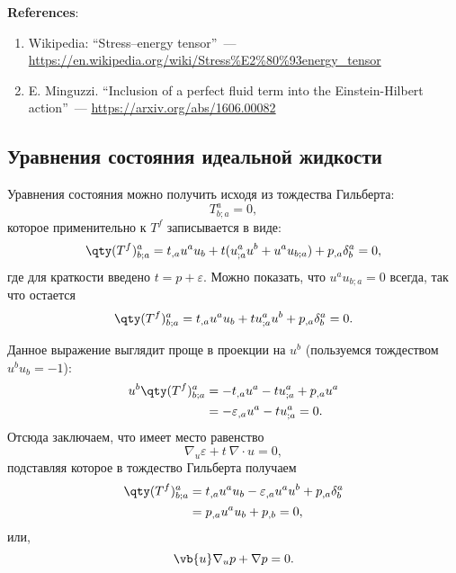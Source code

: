 \documentclass[\docroot/reports/draft/report.tex]{subfiles}
\begin{document}
    \vspace{1cm}

    \textbf{\Large{References}}:
    \begin{enumerate}
        \item Wikipedia: \enquote{Stress–energy tensor}~--- \url{https://en.wikipedia.org/wiki/Stress%E2%80%93energy_tensor}
        \item E. Minguzzi. \enquote{Inclusion of a perfect fluid term into the Einstein-Hilbert action}~--- \url{https://arxiv.org/abs/1606.00082}
    \end{enumerate}

\subsection{Уравнения состояния идеальной жидкости}

    Уравнения состояния можно получить исходя из тождества Гильберта:
    \begin{equation}
        T^a_{b;a} = 0 ,
    \end{equation}
    которое применительно к $T^f$ записывается в виде:
    \begin{equation*}
        \qty(T^f)^a_{b;a} = t_{,a} u^a u_b + t (u^a_{;a} u^b + u^a u_{b;a}) + p_{,a} \delta^a_b = 0,
    \end{equation*}
    где для краткости введено $t = p + \varepsilon$. Можно показать, что $u^a u_{b;a} = 0$ всегда, так что остается
    \begin{equation}
        \qty(T^f)^a_{b;a} = t_{,a} u^a u_b + t u^a_{;a} u^b + p_{,a} \delta^a_b = 0.
    \end{equation}

    Данное выражение выглядит проще в проекции на $u^b$ (пользуемся тождеством $u^b u_b = -1$):
    \begin{equation*}\begin{aligned}
        u^b \qty(T^f)^a_{b;a} &= - t_{,a} u^a - t u^a_{;a} + p_{,a} u^a \\
                              &= - \varepsilon_{,a} u^a - t u^a_{;a} = 0 .
    \end{aligned}\end{equation*}
    Отсюда заключаем, что имеет место равенство
    \begin{equation}
        \nabla_u \varepsilon + t\ \nabla \cdot u = 0 ,
    \end{equation}
    подставляя которое в тождество Гильберта получаем
    \begin{equation*}\begin{aligned}
        \qty(T^f)^a_{b;a} &= t_{,a} u^a u_b - \varepsilon_{,a} u^a u^b + p_{,a} \delta^a_b \\
                          &= p_{,a} u^a u_b + p_{,b} = 0 ,
    \end{aligned}\end{equation*}
    или,
    \begin{equation}
        \vb{u} \nabla_u p + \nabla p = 0 .
    \end{equation}
\end{document}
